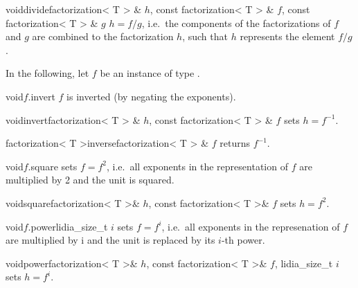 \begin{fcode}{void}{divide}{factorization< T > & $h$, const factorization< T > & $f$,
    const factorization< T > & $g$}%
  $h = f / g$, i.e.~the components of the factorizations of $f$ and $g$ are combined to the
  factorization $h$, such that $h$ represents the element $f / g$.
\end{fcode}

In the following, let $f$ be an instance of type .

\begin{fcode}{void}{$f$.invert}{}
  $f$ is inverted (by negating the exponents).
\end{fcode}


\begin{fcode}{void}{invert}{factorization< T > & $h$,  const factorization< T > & $f$}
  sets $h = f^{-1}$.
\end{fcode}

\begin{fcode}{factorization< T >}{inverse}{factorization< T > & $f$}
  returns $f^{-1}$.
\end{fcode}

\begin{fcode}{void}{$f$.square}{}
  sets $f = f^2$, i.e.~all exponents in the representation of $f$ are multiplied by 2 and the
  unit is squared.
\end{fcode}

\begin{fcode}{void}{square}{factorization< T >& $h$,  const factorization< T >& $f$}
  sets $h = f^2$.
\end{fcode}

\begin{fcode}{void}{$f$.power}{lidia_size_t $i$}
  sets $f = f^i$, i.e.~all exponents in the represenation of $f$ are multiplied by i and the
  unit is replaced by its $i$-th power.
\end{fcode}

\begin{fcode}{void}{power}{factorization< T >& $h$, const factorization< T >& $f$,  lidia_size_t $i$}
  sets $h = f^i$.
\end{fcode}



